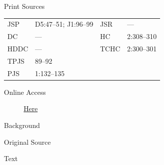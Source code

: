 			\begin{description}
				\item[Print Sources]
			\end{description}

				\begin{tabular}{p{0.5in}p{1in}p{0.5in}p{1in}}
				JSP	 	& D5:47--51; J1:96--99		& JSR 		& --- \\
				DC	 	& --- 			& HC 		& 2:308--310 \\
				HDDC 	& ---			& TCHC 		& 2:300--301 \\
				TPJS 	& 89--92			& 	 		&  \\
				PJS 	& 1:132--135			& 	 		&  \\
				\end{tabular}
			
			\begin{description}
				\item[Online Access] \href{https://www.josephsmithpapers.org/paper-summary/discourse-12-november-1835/1}{Here}
			\end{description}
			
			\begin{description}
				\item[Background]
			\end{description}
			
			
			\begin{description}
				\item[Original Source]
			\end{description}
			
			
			\begin{description}
				\item[Text]
			\end{description}
			
